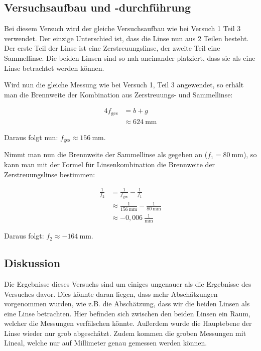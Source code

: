     \subsection{Versuchsaufbau und -durchführung}

        Bei diesem Versuch wird der gleiche Versuchsaufbau wie bei Versuch 1 Teil 3 verwendet. Der einzige Unterschied ist, dass die Linse nun aus 2 Teilen besteht. Der erste Teil der Linse ist eine Zerstreuungslinse, der zweite Teil eine Sammellinse. Die beiden Linsen sind so nah aneinander platziert, dass sie als eine Linse betrachtet werden können.

        Wird nun die gleiche Messung wie bei Versuch 1, Teil 3 angewendet, so erhält man die Brennweite der Kombination aus Zerstreuungs- und Sammellinse:

        $$
        \begin{aligned}
            4f_{\mathrm{ges}} &= b + g\\
            &\approx 624\ \mathrm{mm}
        \end{aligned}
        $$

        Daraus folgt nun: $f_{\mathrm{ges}} \approx 156\ \mathrm{mm}$.

        Nimmt man nun die Brennweite der Sammellinse als gegeben an ($f_{1} = 80\ \mathrm{mm}$), so kann man mit der Formel für Linsenkombination die Brennweite der Zerstreuungslinse bestimmen:

        $$
        \begin{aligned}
            \frac{1}{f_{2}} &= \frac{1}{f_{\mathrm{ges}}} - \frac{1}{f_{1}}\\
            &\approx \frac{1}{156\ \mathrm{mm}} - \frac{1}{80\ \mathrm{mm}}\\
            &\approx -0,006\ \frac{1}{\mathrm{mm}}
        \end{aligned}
        $$

        Daraus folgt: $f_{2} \approx -164\ \mathrm{mm}$.

    \subsection{Diskussion}

        Die Ergebnisse dieses Versuchs sind um einiges ungenauer als die Ergebnisse des Versuches davor. Dies könnte daran liegen, dass mehr Abschätzungen vorgenommen wurden, wie z.B. die Abschätzung, dass wir die beiden Linsen als eine Linse betrachten. Hier befinden sich zwischen den beiden Linsen ein Raum, welcher die Messungen verfälschen könnte. Außerdem wurde die Hauptebene der Linse wieder nur grob abgeschätzt. Zudem kommen die groben Messungen mit Lineal, welche nur auf Millimeter genau gemessen werden können.

